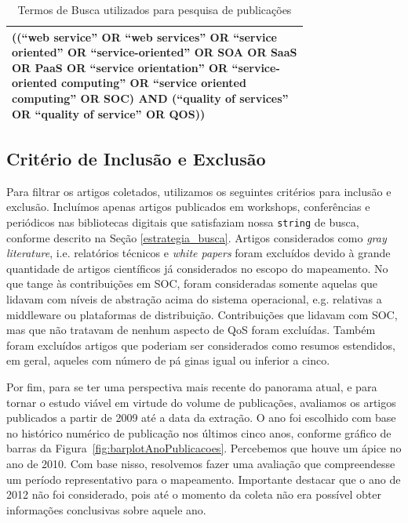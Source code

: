 \begin{table}[ht]
\centering
\caption{Termos de Busca utilizados para pesquisa de publicações}
\label{tab:exTable1}
\begin{tabular}{p{0.75\linewidth}}
\hline
((``web service'' OR ``web services'' OR ``service oriented'' OR ``service-oriented'' OR SOA OR SaaS OR PaaS OR ``service orientation'' OR ``service-oriented computing'' OR ``service oriented computing'' OR SOC) AND (``quality of services'' OR ``quality of service'' OR QOS)) \\
\hline
\end{tabular}
\end{table}


\subsection{Crit\'{e}rio de Inclusão e Exclusão}\label{criterios_inc_exc}

Para filtrar os artigos coletados, utilizamos os seguintes critérios para inclus\~{a}o e exclus\~{a}o. Inclu\'{i}mos apenas artigos publicados em workshops, confer\^{e}ncias e peri\'{o}dicos nas bibliotecas digitais que satisfaziam nossa \texttt{string} de busca, conforme descrito na Se\c{c}\~{a}o \ref{estrategia_busca}. Artigos considerados como \emph{gray literature}, i.e. relat\'{o}rios t\'{e}cnicos e \emph{white papers} foram exclu\'{i}dos devido à grande quantidade de artigos científicos já considerados no escopo do mapeamento. No que tange \`{a}s contribui\c{c}\~{o}es em SOC, foram consideradas somente aquelas que lidavam com n\'{i}veis de abstra\c{c}\~{a}o acima do sistema operacional, e.g. relativas a middleware ou plataformas de distribui\c{c}\~{a}o. Contribui\c{c}\~{o}es que lidavam com SOC, mas que n\~{a}o tratavam de nenhum aspecto de QoS foram exclu\'{i}das. Tamb\'{e}m foram exclu\'{i}dos artigos que poderiam ser considerados como resumos estendidos, em geral, aqueles com n\'{u}mero de p\'{a}
ginas igual ou inferior a cinco. 

Por fim, para se ter uma perspectiva mais recente do panorama atual, e para tornar o estudo vi\'{a}vel em virtude do volume de publica\c{c}\~{o}es, avaliamos os artigos publicados a partir de 2009 at\'{e} a data da extra\c{c}\~{a}o. O ano foi escolhido com base no hist\'{o}rico num\'{e}rico de publica\c{c}\~{a}o nos \'{u}ltimos cinco anos, conforme gr\'{a}fico de barras da  Figura~\ref{fig:barplotAnoPublicacoes}. Percebemos que houve um \'{a}pice no ano de 2010. Com base nisso, resolvemos fazer uma avalia\c{c}\~{a}o que compreendesse um per\'{i}odo representativo para o mapeamento. Importante destacar que o ano de 2012 n\~{a}o foi considerado, pois at\'{e} o momento da coleta n\~{a}o era poss\'{i}vel obter informa\c{c}\~{o}es conclusivas sobre aquele ano.

